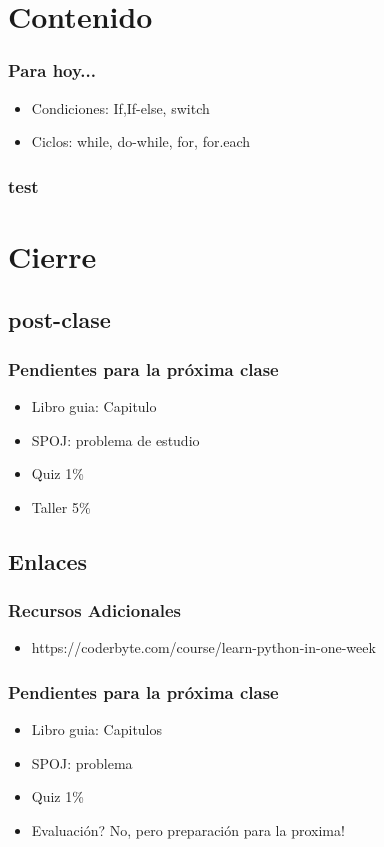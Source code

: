 \documentclass[xcolor=svgnames]{beamer}
\theoremstyle{example}
\begin{document}
\section{Contenido}

\begin{frame}
  \frametitle{Para hoy...}
\begin{itemize}
\item Condiciones: If,If-else, switch
\item Ciclos: while, do-while, for, for.each
\end{itemize}
\end{frame}

\begin{frame}
  \frametitle{test}
  
\end{frame}

\section{Cierre}
\subsection{post-clase}

\begin{frame}
  \frametitle{Pendientes para la próxima clase}
  \begin{itemize}
  \item{Libro guia: Capitulo }
    \item{SPOJ: problema de estudio}
  \item{Quiz 1\%}
  \item{Taller 5\%}
  \end{itemize}
\end{frame}

\subsection{Enlaces}
\begin{frame}
  \frametitle{Recursos Adicionales}
  \begin{itemize}
  \item https://coderbyte.com/course/learn-python-in-one-week
  \end{itemize}
\end{frame}

\begin{frame}
  \frametitle{Pendientes para la próxima clase}
  \begin{itemize}
  \item{Libro guia: Capitulos }
    \item{SPOJ: problema }
  \item{Quiz 1\%}
  \item{Evaluación? No, pero preparación para la proxima!}
  \end{itemize}
\end{frame}
\end{document}
